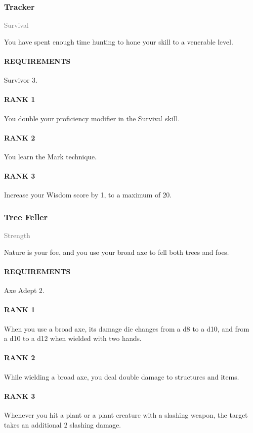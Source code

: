 \subsubsection{Tracker} \label{feat::tracker}
\small{\textcolor{gray}{Survival}}

\normalsize
You have spent enough time hunting to hone your skill to a venerable level.
\paragraph{REQUIREMENTS} Survivor 3.
\paragraph{RANK 1} You double your proficiency modifier in the Survival skill.
\paragraph{RANK 2} You learn the Mark technique.
\paragraph{RANK 3} Increase your Wisdom score by 1, to a maximum of 20.

\subsubsection{Tree Feller} \label{feat::treefeller}
\small{\textcolor{gray}{Strength}}

\normalsize
Nature is your foe, and you use your broad axe to fell both trees and foes.
\paragraph{REQUIREMENTS} Axe Adept 2.
\paragraph{RANK 1} When you use a broad axe, its damage die changes from a d8 to a d10, and from a d10 to a d12 when wielded with two hands.
\paragraph{RANK 2} While wielding a broad axe, you deal double damage to structures and items.
\paragraph{RANK 3} Whenever you hit a plant or a plant creature with a slashing weapon, the target takes an additional 2 slashing damage.

